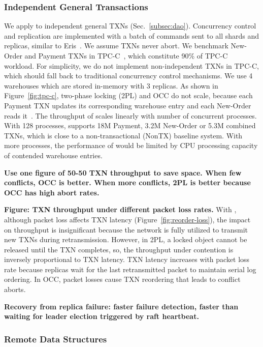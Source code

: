 \subsubsection{Independent General Transactions}
\label{subsec:eval-transactions}

We apply \sys to independent general TXNs (Sec.~\ref{subsec:dao}).
Concurrency control and replication are implemented with a batch of commands sent to all shards and replicas, similar to Eris~\cite{eris}.
We assume TXNs never abort.
We benchmark New-Order and Payment TXNs in TPC-C~\cite{tpcc}, which constitute 90\% of TPC-C workload.
For simplicity, we do not implement non-independent TXNs in TPC-C, which should fall back to traditional concurrency control mechanisms.
We use 4 warehouses which are stored in-memory with 3 replicas.
As shown in Figure~\ref{fig:tpc-c}, two-phase locking (2PL) and OCC do not scale, because each Payment TXN updates its corresponding warehouse entry and each New-Order reads it~\cite{yu2014staring}.
The throughput of \sys scales linearly with number of concurrent processes. With 128 processes, \sys supports 18M Payment, 3.2M New-Order or 5.3M combined TXNs, which is close to a non-transactional (NonTX) baseline system. With more processes, the performance of \sys{} would be limited by CPU processing capacity of contended warehouse entries.

\textbf{Use one figure of 50-50 TXN throughput to save space. When few conflicts, OCC is better. When more conflicts, 2PL is better because OCC has high abort rates.}

\textbf{Figure: TXN throughput under different packet loss rates.}
With \sys{}, although packet loss affects TXN latency (Figure~\ref{fig:reorder-loss}), the impact on throughput is insignificant because the network is fully utilized to transmit new TXNs during retransmission.
However, in 2PL, a locked object cannot be released until the TXN completes, so, the throughput under contention is inversely proportional to TXN latency.
TXN latency increases with packet loss rate because replicas wait for the last retransmitted packet to maintain serial log ordering.
In OCC, packet losses cause TXN reordering that leads to conflict aborts.


\textbf{Recovery from replica failure: faster failure detection, faster than waiting for leader election triggered by raft heartbeat.}

\subsubsection{Remote Data Structures}
\label{subsec:data-structure}


